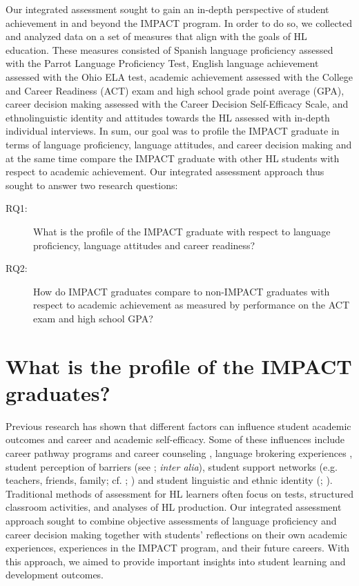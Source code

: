 \documentclass[output=paper]{langscibook}
\begin{document}
Our integrated assessment sought to gain an in-depth perspective of student achievement in and beyond the IMPACT program. In order to do so, we collected and analyzed data on a set of measures that align with the goals of HL education. These measures consisted of Spanish language proficiency assessed with the Parrot Language Proficiency Test, English language achievement assessed with the Ohio ELA test, academic achievement assessed with the College and Career Readiness (ACT) exam and high school grade point average (GPA), career decision making assessed with the Career Decision Self-Efficacy Scale, and ethnolinguistic identity and attitudes towards the HL assessed with in-depth individual interviews. In sum, our goal was to profile the IMPACT graduate in terms of language proficiency, language attitudes, and career decision making and at the same time compare the IMPACT graduate with other HL students with respect to academic achievement. Our integrated assessment approach thus sought to answer two research questions:

\begin{description}
\item[RQ1:] What is the profile of the IMPACT graduate with respect to language proficiency, language attitudes and career readiness?
\item[RQ2:] How do IMPACT graduates compare to non-IMPACT graduates with respect to academic achievement as measured by performance on the ACT exam and high school GPA?
\end{description}

\section{What is the profile of the IMPACT graduates?}

Previous research has shown that different factors can influence student academic outcomes and career and academic self-efficacy. Some of these influences include career pathway programs and career counseling \citep{StipanovicWitherell2017}, language brokering experiences \citep{BurielMoran1998}, student perception of barriers (see \citealt{LuzzoMcWhirter2001}; \textit{inter alia}), student support networks (e.g. teachers, friends, family; cf. \citealt{BerberyOBrien2018}; \citealt{CarpiLents2017}) and student linguistic and ethnic identity (\citealt{Mejia-SmithGushue2017}; \citealt{OjedaLeigh2012}). Traditional methods of assessment for HL learners often focus on tests, structured classroom activities, and analyses of HL production. Our integrated assessment approach sought to combine objective assessments of language proficiency and career decision making together with students' reflections on their own academic experiences, experiences in the IMPACT program, and their future careers. With this approach, we aimed to provide important insights into student learning and development outcomes.
\end{document}
